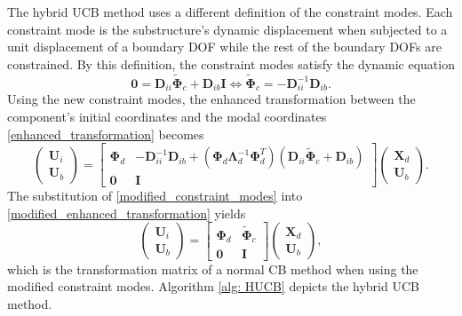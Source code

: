 The hybrid UCB method uses a different definition of the constraint modes.
Each constraint mode is the substructure's dynamic displacement when subjected to a unit displacement of a boundary DOF while the rest of the boundary DOFs are constrained.
{By this definition, the constraint modes satisfy the dynamic equation}%
\begin{equation}
    \mathbf{0}
    =
    \mathbf{D}_{ii}
    \tilde{\mathbf{\Phi}}_{c}
    +
    \mathbf{D}_{ib}
    \mathbf{I}
    \iff
    \tilde{\mathbf{\Phi}}_{c}
    =
    -\mathbf{D}_{ii}^{-1}
    \mathbf{D}_{ib}.
    \label{modified_constraint_modes}
\end{equation}
{Using the new constraint modes, the enhanced transformation between the component's initial coordinates and the modal coordinates \eqref{enhanced_transformation} becomes}
\begin{equation}
    \begin{pmatrix}
        \mathbf{U}_{i} \\
        \mathbf{U}_{b}
    \end{pmatrix}
    =
    \begin{bmatrix}
        \mathbf{\Phi}_{d} &
        -\mathbf{D}_{ii}^{-1} \mathbf{D}_{ib}
        +
        \left(
            \mathbf{\Phi}_{d}
            \mathbf{\Lambda}_{d}^{-1}
            \mathbf{\Phi}_{d}^{T}
        \right)
        \left(
            \mathbf{D}_{ii}
            \tilde{\mathbf{\Phi}}_{c}
            +
            \mathbf{D}_{ib}
        \right)
        \\
        \mathbf{0}
        &
        \mathbf{I}
    \end{bmatrix}
    \begin{pmatrix}
        \mathbf{X}_{d} \\
        \mathbf{U}_{b}
    \end{pmatrix}.
    \label{modified_enhanced_transformation}
\end{equation}
{The substitution of \eqref{modified_constraint_modes} into \eqref{modified_enhanced_transformation} yields}%
\begin{equation}
    \begin{pmatrix}
        \mathbf{U}_{i} \\
        \mathbf{U}_{b}
    \end{pmatrix}
    =
    \begin{bmatrix}
        \mathbf{\Phi}_{d} &
        \tilde{\mathbf{\Phi}}_{c} \\
        \mathbf{0} & \mathbf{I}
    \end{bmatrix}
    \begin{pmatrix}
        \mathbf{X}_{d} \\
        \mathbf{U}_{b}
    \end{pmatrix},
\end{equation}
which is the transformation matrix of a normal CB method when using the modified constraint modes.
Algorithm \ref{alg: HUCB} depicts the hybrid UCB method.

